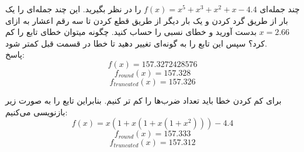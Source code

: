 چند جمله‌ای $f(x) = x^5 + x^3 + x^2 + x - 4.4$ را در نظر بگیرید. این چند جمله‌ای را یک بار از طریق گرد کردن و یک بار دیگر از طریق قطع کردن تا سه رقم اعشار به ازای $x = 2.66$ بدست آورید و خطای نسبی را حساب کنید. چگونه میتوان خطای تابع را کم کرد؟ سپس این تابع را به گونه‌ای تغییر دهید تا خطا در قسمت قبل کمتر شود.\\


پاسخ:\\
$$f(x) = 157.3272428576$$
$$f_{round}(x) = 157.328$$
$$f_{truncated}(x) = 157.326$$


برای کم کردن خطا باید تعداد ضرب‌ها را کم تر کنیم. بنابراین تایع را به صورت زیر بازنویسی می‌کنیم:\\

$$f(x) = x (1 + x (1 + x (1 + x^2))) - 4.4$$
$$f_{round}(x) = 157.333$$
$$f_{truncated}(x) = 157.312$$